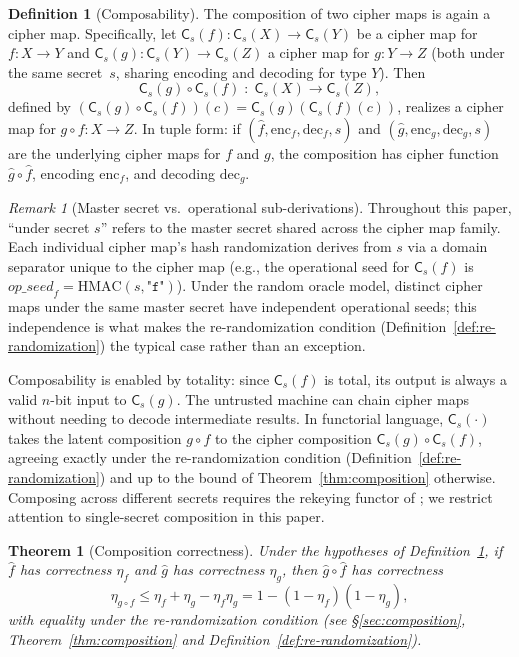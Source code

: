 \documentclass[11pt]{article}
\theoremstyle{definition}
\newtheorem{definition}{Definition}[section]
\theoremstyle{plain}
\newtheorem{theorem}{Theorem}[section]
\theoremstyle{remark}
\newtheorem{remark}{Remark}[section]
\newcommand{\fhat}{\hat{f}}
\newcommand{\ghat}{\hat{g}}
\newcommand{\enc}{\mathrm{enc}}
\newcommand{\dec}{\mathrm{dec}}
\newcommand{\cipherS}[2]{\mathsf{C}_{#2}(#1)}
\begin{document}
\begin{definition}[Composability]
\label{def:composability}
The composition of two cipher maps is again a cipher map.  Specifically,
let $\cipherS{f}{s} : \cipherS{X}{s} \to \cipherS{Y}{s}$ be a cipher map
for $f : X \to Y$ and $\cipherS{g}{s} : \cipherS{Y}{s} \to \cipherS{Z}{s}$
a cipher map for $g : Y \to Z$ (both under the same secret~$s$, sharing
encoding and decoding for type $Y$).  Then
\[
\cipherS{g}{s} \circ \cipherS{f}{s} \;:\; \cipherS{X}{s} \to \cipherS{Z}{s},
\]
defined by $(\cipherS{g}{s} \circ \cipherS{f}{s})(c) = \cipherS{g}{s}(\cipherS{f}{s}(c))$,
realizes a cipher map for $g \circ f : X \to Z$.  In tuple form: if
$(\fhat, \enc_f, \dec_f, s)$ and $(\ghat, \enc_g, \dec_g, s)$ are the
underlying cipher maps for $f$ and $g$, the composition has cipher
function $\ghat \circ \fhat$, encoding $\enc_f$, and decoding $\dec_g$.
\end{definition}

\begin{remark}[Master secret vs.\ operational sub-derivations]
\label{rem:master-vs-op}
Throughout this paper, ``under secret $s$'' refers to the master secret
shared across the cipher map family.  Each individual cipher map's
hash randomization derives from $s$ via a domain separator unique to
the cipher map (e.g., the operational seed for $\cipherS{f}{s}$ is
$\mathit{op\_seed}_f = \mathrm{HMAC}(s, \texttt{"f"})$).  Under the
random oracle model, distinct cipher maps under the same master secret
have independent operational seeds; this independence is what makes the
re-randomization condition (Definition~\ref{def:re-randomization}) the
typical case rather than an exception.
\end{remark}

Composability is enabled by totality: since $\cipherS{f}{s}$ is total,
its output is always a valid $n$-bit input to $\cipherS{g}{s}$.  The
untrusted machine can chain cipher maps without needing to decode
intermediate results.  In functorial language, $\cipherS{\cdot}{s}$
takes the latent composition $g \circ f$ to the cipher composition
$\cipherS{g}{s} \circ \cipherS{f}{s}$, agreeing exactly under the
re-randomization condition (Definition~\ref{def:re-randomization}) and
up to the bound of Theorem~\ref{thm:composition} otherwise.  Composing
across different secrets requires the rekeying functor of
\cite{towell2026rekeying}; we restrict attention to single-secret
composition in this paper.

\begin{theorem}[Composition correctness]
\label{thm:composition-correctness}
Under the hypotheses of Definition~\ref{def:composability}, if $\fhat$ has
correctness $\eta_f$ and $\ghat$ has correctness $\eta_g$, then
$\ghat \circ \fhat$ has correctness
\[
\eta_{g \circ f} \leq \eta_f + \eta_g - \eta_f \eta_g
  = 1 - (1 - \eta_f)(1 - \eta_g),
\]
with equality under the re-randomization condition (see
\S\ref{sec:composition}, Theorem~\ref{thm:composition} and
Definition~\ref{def:re-randomization}).
\end{theorem}
\end{document}
